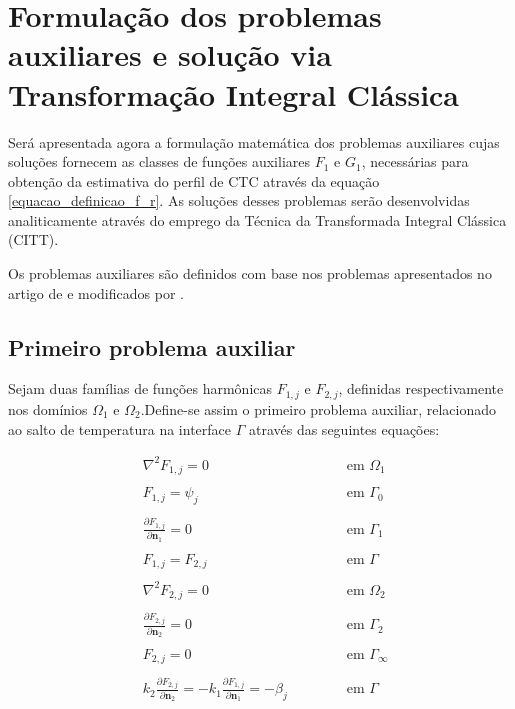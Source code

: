 \section{Formulação dos problemas auxiliares e solução via Transformação Integral Clássica}\label{secao_probs_aux}

Será apresentada agora a formulação matemática dos problemas auxiliares cujas soluções fornecem as classes de funções auxiliares $F_1$ e $G_1$, necessárias
para obtenção da estimativa do perfil de CTC através da equação \eqref{equacao_definicao_f_r}. As soluções desses problemas serão desenvolvidas analiticamente através do
emprego da Técnica da Transformada Integral Clássica (CITT). 

Os problemas auxiliares são definidos com base nos problemas apresentados no artigo de \cite{reciproc_2} e modificados por \cite{tese_abreu}.  

\subsection{Primeiro problema auxiliar}\label{secao_do_primeiro}

Sejam duas famílias de funções harmônicas $F_{1, j}$ e $F_{2, j}$, definidas respectivamente nos domínios $\Omega_1$ e $\Omega_2$.Define-se assim o primeiro
problema auxiliar, relacionado ao salto de temperatura na interface $\Gamma$ através das seguintes equações:

\begin{subequations}
	\begin{alignat}{2}
	& \nabla^2 F_{1,j} = 0 \quad\quad\quad\quad\quad && \text{ em } \Omega_1 \label{funcao_F_harm_T1} \\ \nonumber \\
	& F_{1,j} = \psi_j && \text{ em } \Gamma_0  \label{funcao_F_cc_T1_2} \\ \nonumber \\
	& \frac{\partial F_{1,j}}{\partial \mathbf{n}_1} = 0 && \text{ em }  \Gamma_1 \label{funcao_F_cc_T1_1} \\ \nonumber \\
	& F_{1,j} = F_{2, j} \quad\quad\quad\quad\quad\quad\quad\quad && \text{ em }  \Gamma \label{funcao_F_cc_grad_T1} \\ \nonumber \\
	& \nabla^2 F_{2,j} = 0 && \text{ em }  \Omega_2 \label{funcao_F_harm_T2} \\ \nonumber \\
	& \frac{\partial F_{2,j}}{\partial \mathbf{n}_2} = 0 && \text{ em }  \Gamma_2 \label{funcao_F_cc_T1_3} \\ \nonumber \\
	& F_{2,j} = 0 && \text{ em }  \Gamma_\infty \label{funcao_F_cc_T1_4} \\ \nonumber \\
	& k_2\frac{\partial F_{2, j}}{\partial\mathbf{n}_2} = - k_1\frac{\partial F_{1,j}}{\partial\mathbf{n}_1} = -\beta_j && \text{ em }  \Gamma \label{funcao_F_cc_T1_5}
	\end{alignat}
\end{subequations}

